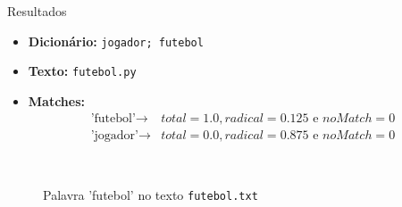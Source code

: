 \documentclass{beamer}
\begin{document}
	\begin{frame}{Resultados}
		\begin{itemize}
			\item \textbf{Dicionário:  }\texttt{jogador;  futebol}\\
			\item \textbf{Texto:  } \texttt{futebol.py}
			\item \textbf{Matches:  } 
				\begin{align*}
					\text{'futebol'} \rightarrow &total = 1.0, radical = 0.125 \text{ e } noMatch = 0\\
					\text{'jogador'} \rightarrow &total = 0.0, radical = 0.875 \text{ e } noMatch = 0
				\end{align*}
		\end{itemize}
	\end{frame}
	
	\begin{frame}
		\begin{figure}[H]
			\centering
			~
			~
			~
			\caption{Palavra 'futebol' no texto \texttt{futebol.txt}}	
		\end{figure}
	\end{frame}
	
\end{document}

